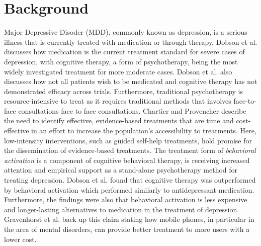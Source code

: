\section{Background}


Major Depressive Disoder (MDD), commonly known as depression, is a serious illness that is currently treated with medication or through therapy. Dobson et al. \cite{randomized_trial_behavioural_activation} discusses how medication is the current treatment standard for severe cases of depression, with cognitive therapy, a form of psychotherapy, being the most widely investigated treatment for more moderate cases. Dobson et al. also discusses how not all patients wish to be medicated and cognitive therapy has not demonstrated efficacy across trials. Furthermore, traditional psychotherapy is resource-intensive to treat as it requires traditional methods that involves face-to-face consultations face to face consultations. Chartier and Provencher \cite{behavioural_activation_for_depression} describe the need to identify effective, evidence-based treatments that are time and cost-effective in an effort to increase the population's accessibility to treatments. Here, low-intensity interventions, such as guided self-help treatments, hold promise for the dissemination of evidence-based treatments. The treatment form of \textit{behavioral activation} is a component of cognitive behavioral therapy, is receiving increased attention and empirical support as a stand-alone psychotherapy method for treating depression.  Dobson et al. found that cognitive therapy was outperformed by behavioral activation which performed similarly to antidepressant medication. Furthermore, the findings were also that behavioral activation is less expensive and longer-lasting alternatives to medication in the treatment of depression. Gravenhorst et al. \cite{Gravenhorst2015} back up this claim stating how mobile phones, in particular in the area of mental disorders, can provide better treatment to more users with a lower cost. \\


